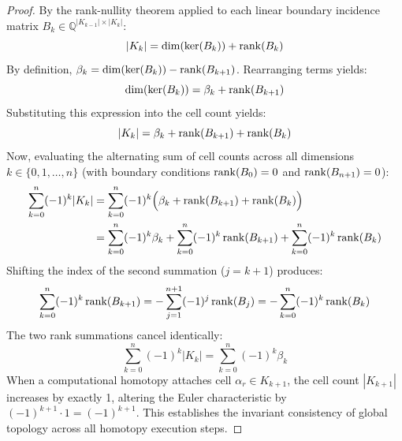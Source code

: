 \begin{proof}
By the rank-nullity theorem applied to each linear boundary incidence matrix $B_k \in \mathbb{Q}^{|K_{k-1}| \times |K_k|}$:
\begin{equation}
    |K_k| = \dim(\operatorname{ker}(B_k)) + \operatorname{rank}(B_k)
\end{equation}
By definition, $\beta_k = \dim(\operatorname{ker}(B_k)) - \operatorname{rank}(B_{k+1})$. Rearranging terms yields:
\begin{equation}
    \dim(\operatorname{ker}(B_k)) = \beta_k + \operatorname{rank}(B_{k+1})
\end{equation}
Substituting this expression into the cell count yields:
\begin{equation}
    |K_k| = \beta_k + \operatorname{rank}(B_{k+1}) + \operatorname{rank}(B_k)
\end{equation}
Now, evaluating the alternating sum of cell counts across all dimensions $k \in \{0, 1, \dots, n\}$ (with boundary conditions $\operatorname{rank}(B_0) = 0$ and $\operatorname{rank}(B_{n+1}) = 0$):
\begin{align}
    \sum_{k=0}^n (-1)^k |K_k| &= \sum_{k=0}^n (-1)^k \Big( \beta_k + \operatorname{rank}(B_{k+1}) + \operatorname{rank}(B_k) \Big) \\
    &= \sum_{k=0}^n (-1)^k \beta_k + \sum_{k=0}^n (-1)^k \operatorname{rank}(B_{k+1}) + \sum_{k=0}^n (-1)^k \operatorname{rank}(B_k)
\end{align}
Shifting the index of the second summation ($j = k+1$) produces:
\begin{equation}
    \sum_{k=0}^n (-1)^k \operatorname{rank}(B_{k+1}) = - \sum_{j=1}^{n+1} (-1)^j \operatorname{rank}(B_j) = - \sum_{k=0}^n (-1)^k \operatorname{rank}(B_k)
\end{equation}
The two rank summations cancel identically:
\begin{equation}
    \sum_{k=0}^n (-1)^k |K_k| = \sum_{k=0}^n (-1)^k \beta_k
\end{equation}
When a computational homotopy attaches cell $\alpha_r \in K_{k+1}$, the cell count $|K_{k+1}|$ increases by exactly 1, altering the Euler characteristic by $(-1)^{k+1} \cdot 1 = (-1)^{k+1}$. This establishes the invariant consistency of global topology across all homotopy execution steps.
\end{proof}

